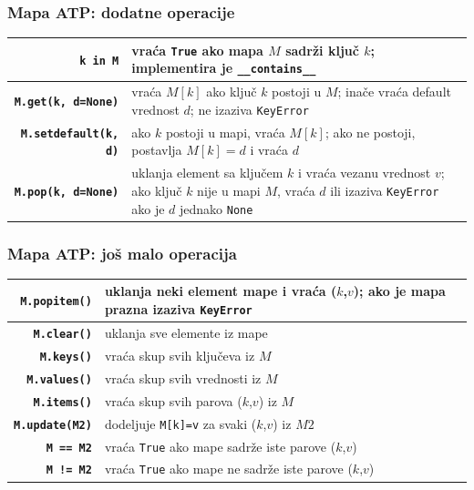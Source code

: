 \documentclass[compress]{beamer}
\begin{document}
\begin{frame}[fragile]
  \frametitle{Mapa ATP: dodatne operacije}
  \begin{center}
    \begin{tabular}{rp{6cm}}
      \textbf{\texttt{k in M}} & vraća \texttt{True} ako mapa $M$ sadrži ključ $k$; implementira je \texttt{\_\_contains\_\_} \\ \hline
      \textbf{\texttt{M.get(k, d=None)}} & vraća $M[k]$ ako ključ $k$ postoji u $M$; inače vraća default vrednost $d$; ne izaziva \texttt{KeyError} \\ \hline
      \textbf{\texttt{M.setdefault(k, d)}} & ako $k$ postoji u mapi, vraća $M[k]$; ako ne postoji, postavlja $M[k]=d$ i vraća $d$ \\ \hline
      \textbf{\texttt{M.pop(k, d=None)}} & uklanja element sa ključem $k$ i vraća vezanu vrednost $v$; ako ključ $k$ nije u mapi $M$, vraća $d$ ili izaziva \texttt{KeyError} ako je $d$ jednako \texttt{None}
    \end{tabular}
  \end{center}
\end{frame}

\begin{frame}[fragile]
  \frametitle{Mapa ATP: još malo operacija}
  \begin{center}
    \begin{tabular}{rp{8cm}}
      \textbf{\texttt{M.popitem()}} & uklanja neki element mape i vraća ($k$,$v$); ako je mapa prazna izaziva \texttt{KeyError} \\ \hline
      \textbf{\texttt{M.clear()}} & uklanja sve elemente iz mape \\ \hline
      \textbf{\texttt{M.keys()}} & vraća skup svih ključeva iz $M$ \\ \hline
      \textbf{\texttt{M.values()}} & vraća skup svih vrednosti iz $M$ \\ \hline
      \textbf{\texttt{M.items()}} & vraća skup svih parova ($k$,$v$) iz $M$ \\ \hline
      \textbf{\texttt{M.update(M2)}} & dodeljuje \texttt{M[k]=v} za svaki ($k$,$v$) iz $M2$ \\ \hline
      \textbf{\texttt{M == M2}} & vraća \texttt{True} ako mape sadrže iste parove ($k$,$v$) \\ \hline
      \textbf{\texttt{M != M2}} & vraća \texttt{True} ako mape ne sadrže iste parove ($k$,$v$)
    \end{tabular}
  \end{center}
\end{frame}
\end{document}
